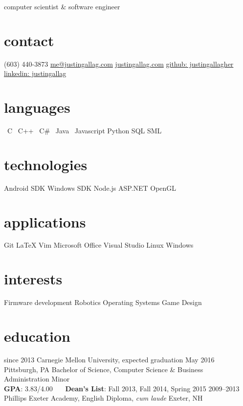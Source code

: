 \documentclass[]{friggeri-cv}
\newcommand{\starr}{\raisebox{0.2ex}{$\star $}}
\begin{document}
    {computer scientist \& software engineer}

    \begin{aside}
        \section{contact}
            (603) 440-3873
            \href{mailto:me@justingallag.com}{me@justingallag.com}
            \href{http://justingallag.com}{justingallag.com}
            \href{https://github.com/justingallagher}{github: justingallagher}
            \href{https://www.linkedin.com/in/justingallag}{linkedin: justingallag}
        \section{languages}
            \starr \ C
            \starr \ C++
            \starr \ C\#
            \starr \ Java
            \starr \ Javascript
            Python
            SQL
            SML
        \section{technologies}
            Android SDK
            Windows SDK
            Node.js
            ASP.NET
            OpenGL
        \section{applications}
            Git
            LaTeX
            Vim
            Microsoft Office
            Visual Studio
            Linux
            Windows
        \section{interests}
            Firmware development
            Robotics
            Operating Systems
            Game Design
    \end{aside}

    \section{education}

    \begin{entrylist}
        \entry
            {since 2013}
            {Carnegie Mellon University, {\normalfont expected graduation May 2016}}
            {Pittsburgh, PA}
            {Bachelor of Science, Computer Science \& Business Administration Minor\\
            \textbf{GPA}: 3.83/4.00 \ \ \ \textbf{Dean's List}: Fall 2013, Fall 2014, Spring 2015}
        \entrys
            {2009--2013}
            {Phillips Exeter Academy, {\normalfont English Diploma, \emph{cum laude}}}
            {Exeter, NH}
            {}
    \end{entrylist}
\end{document}
